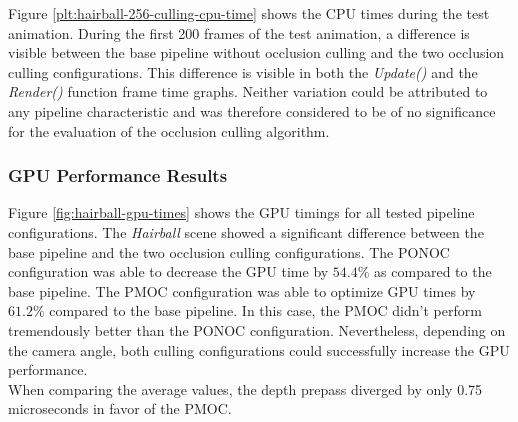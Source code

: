 \noindent
Figure \ref{plt:hairball-256-culling-cpu-time} shows the \ac{CPU} times during the test animation. During 
the first 200 frames of the test animation, a difference is visible between the base pipeline without 
occlusion culling and the two occlusion culling configurations. This difference is visible in both the 
\emph{Update()} and the \emph{Render()} function frame time graphs. Neither variation could be attributed 
to any pipeline characteristic and was therefore considered to be of no significance for the evaluation of 
the occlusion culling algorithm.

\subsubsection*{GPU Performance Results} \label{subsubsec-gpu-performance-results-hairball}

Figure \ref{fig:hairball-gpu-times} shows the \ac{GPU} timings for all tested pipeline configurations.
The \emph{Hairball} scene showed a significant difference between the base pipeline and the two occlusion 
culling configurations. The \ac{PONOC} configuration was able to decrease the \ac{GPU} time by $54.4\%$ 
as compared to the base pipeline. The \ac{PMOC} configuration was able to optimize \ac{GPU} times by 
$61.2\%$ compared to the base pipeline. In this case, the \ac{PMOC} didn't perform tremendously better 
than the \ac{PONOC} configuration. Nevertheless, depending on the camera angle, both culling configurations 
could successfully increase the \ac{GPU} performance. \\

\noindent
When comparing the average values, the depth prepass diverged by only 0.75 microseconds in favor of the \ac{PMOC}.  

